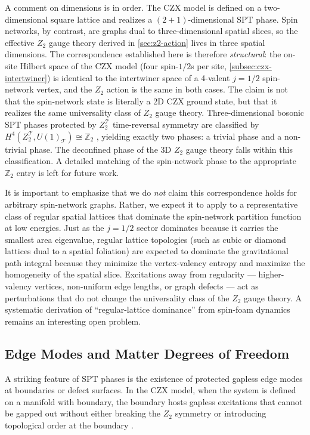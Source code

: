 \documentclass[preprint]{SciPost}
\theoremstyle{plain} %
\begin{document}
A comment on dimensions is in order. The CZX model is defined on a two-dimensional square lattice and realizes a $ (2+1) $-dimensional SPT phase. Spin networks, by contrast, are graphs dual to three-dimensional spatial slices, so the effective $ Z_2 $ gauge theory derived in \autoref{sec:z2-action} lives in three spatial dimensions. The correspondence established here is therefore \emph{structural}: the on-site Hilbert space of the CZX model (four spin-$ 1/2 $s per site, \autoref{subsec:czx-intertwiner}) is identical to the intertwiner space of a 4-valent $ j = 1/2 $ spin-network vertex, and the $ Z_2 $ action is the same in both cases. The claim is not that the spin-network state is literally a 2D CZX ground state, but that it realizes the same universality class of $ Z_2 $ gauge theory. Three-dimensional bosonic SPT phases protected by $ Z_2^{\mathcal{T}} $ time-reversal symmetry are classified by $ H^4(Z_2^{\mathcal{T}}, U(1)_{\mathcal{T}}) \cong \mathbb{Z}_2 $ \cite{Vishwanath2013Physics,Kapustin2014Symmetry}, yielding exactly two phases: a trivial phase and a non-trivial phase. The deconfined phase of the 3D $ Z_2 $ gauge theory falls within this classification. A detailed matching of the spin-network phase to the appropriate $ \mathbb{Z}_2 $ entry is left for future work.

It is important to emphasize that we do \emph{not} claim this correspondence holds for arbitrary spin-network graphs. Rather, we expect it to apply to a representative class of regular spatial lattices that dominate the spin-network partition function at low energies. Just as the $j=1/2$ sector dominates because it carries the smallest area eigenvalue, regular lattice topologies (such as cubic or diamond lattices dual to a spatial foliation) are expected to dominate the gravitational path integral because they minimize the vertex-valency entropy and maximize the homogeneity of the spatial slice. Excitations away from regularity — higher-valency vertices, non-uniform edge lengths, or graph defects — act as perturbations that do not change the universality class of the $Z_2$ gauge theory. A systematic derivation of ``regular-lattice dominance'' from spin-foam dynamics remains an interesting open problem.

\subsection{Edge Modes and Matter Degrees of Freedom}\label{subsec:edge-modes}

A striking feature of SPT phases is the existence of protected gapless edge modes at boundaries or defect surfaces. In the CZX model, when the system is defined on a manifold with boundary, the boundary hosts gapless excitations that cannot be gapped out without either breaking the $ Z_2 $ symmetry or introducing topological order at the boundary \cite{Chen2011Symmetry,Chen2010Local}.
\end{document}
